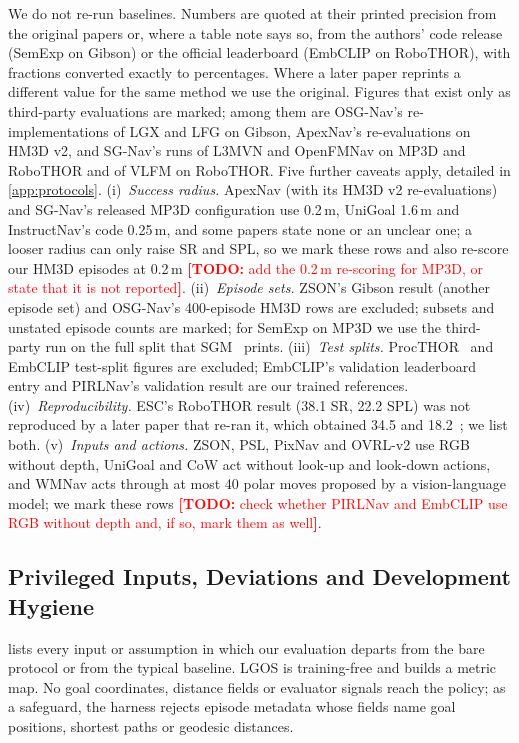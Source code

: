 \documentclass[10pt]{article}
\newcommand{\TODO}[1]{\textcolor{red}{\textbf{[TODO:} #1\textbf{]}}}
\newcommand{\ours}{LGOS\xspace}
\newcommand{\SR}{\textsc{SR}\xspace}
\newcommand{\SPL}{\textsc{SPL}\xspace}
\begin{document}
We do not re-run baselines. Numbers are quoted at their printed precision from the original papers or, where a table
note says so, from the authors' code release (SemExp on Gibson) or the official leaderboard (EmbCLIP on RoboTHOR),
with fractions converted exactly to percentages. Where a later paper reprints a different value for the same method
we use the original. Figures that exist only as third-party evaluations are marked; among them are OSG-Nav's
re-implementations of LGX and LFG on Gibson, ApexNav's re-evaluations on HM3D v2, and SG-Nav's runs of L3MVN and
OpenFMNav on MP3D and RoboTHOR and of VLFM on RoboTHOR. Five further caveats apply, detailed in
\cref{app:protocols}. (i)~\emph{Success radius.} ApexNav (with its HM3D v2 re-evaluations) and SG-Nav's released MP3D
configuration use 0.2\,m, UniGoal 1.6\,m and InstructNav's code 0.25\,m, and some papers state none or an unclear one;
a looser radius can only raise \SR and \SPL, so we mark these rows and also re-score our HM3D episodes at 0.2\,m
\TODO{add the 0.2\,m re-scoring for MP3D, or state that it is not reported}. (ii)~\emph{Episode sets.} ZSON's
Gibson result (another episode set) and OSG-Nav's 400-episode HM3D rows are excluded; subsets and unstated episode
counts are marked; for SemExp on MP3D we use the third-party run on the full split that SGM~\citep{zhang2024imagine}
prints. (iii)~\emph{Test splits.} ProcTHOR~\citep{deitke2022procthor} and EmbCLIP test-split figures are excluded;
EmbCLIP's validation leaderboard entry and PIRLNav's validation result are our trained references.
(iv)~\emph{Reproducibility.} ESC's RoboTHOR result (38.1 \SR, 22.2 \SPL) was not reproduced by a later paper that
re-ran it, which obtained 34.5 and 18.2~\citep{unlu2024reproducibility}; we list both. (v)~\emph{Inputs and
actions.} ZSON, PSL, PixNav and OVRL-v2 use RGB without depth, UniGoal and CoW act without look-up and look-down
actions, and WMNav acts through at most 40 polar moves proposed by a vision-language model; we mark these rows
\TODO{check whether PIRLNav and EmbCLIP use RGB without depth and, if so, mark them as well}.

\subsection{Privileged Inputs, Deviations and Development Hygiene}\label{sec:experiments-privileges}

 lists every input or assumption in which our evaluation departs from the bare protocol or from
the typical baseline. \ours is training-free and builds a metric map. No goal coordinates, distance fields or evaluator
signals reach the policy; as a safeguard, the harness rejects episode metadata whose fields name goal positions,
shortest paths or geodesic distances.
\end{document}
